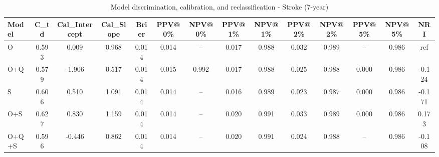 \begin{table}[htbp]
\centering
\small
\caption{Model discrimination, calibration, and reclassification - Stroke (7-year)}
\label{tab:perf_stroke_7y}
\begin{tabular}{lccccccccccccc}
\toprule
Model & C\_td & Cal\_Intercept & Cal\_Slope & Brier & PPV@0\% & NPV@0\% & PPV@1\% & NPV@1\% & PPV@2\% & NPV@2\% & PPV@5\% & NPV@5\% & NRI \\
\midrule
O & 0.593 & 0.009 & 0.968 & 0.014 & 0.014 & -- & 0.017 & 0.988 & 0.032 & 0.989 & -- & 0.986 & ref \\
O+Q & 0.579 & -1.906 & 0.517 & 0.014 & 0.015 & 0.992 & 0.017 & 0.988 & 0.025 & 0.988 & 0.000 & 0.986 & -0.124 \\
S & 0.606 & 0.510 & 1.091 & 0.014 & 0.014 & -- & 0.016 & 0.989 & 0.023 & 0.987 & 0.000 & 0.986 & -0.171 \\
O+S & 0.627 & 0.830 & 1.159 & 0.014 & 0.014 & -- & 0.020 & 0.991 & 0.033 & 0.989 & 0.000 & 0.986 & 0.173 \\
O+Q+S & 0.596 & -0.446 & 0.862 & 0.014 & 0.014 & -- & 0.020 & 0.991 & 0.024 & 0.988 & -- & 0.986 & -0.108 \\
\bottomrule
\end{tabular}
\end{table}